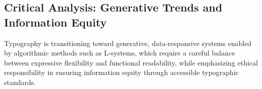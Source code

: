 \subsection{Critical Analysis: Generative Trends and Information Equity}
Typography is transitioning toward generative, data-responsive systems enabled by algorithmic methods such as L-systems, which require a careful balance between expressive flexibility and functional readability, while emphasizing ethical responsibility in ensuring information equity through accessible typographic standards.
